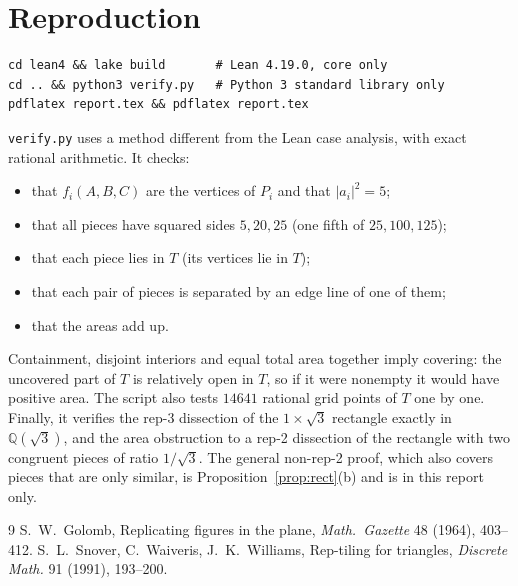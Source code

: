 \documentclass[11pt]{article}
\theoremstyle{definition}
\theoremstyle{remark}
\begin{document}
\section{Reproduction}
\begin{verbatim}
cd lean4 && lake build       # Lean 4.19.0, core only
cd .. && python3 verify.py   # Python 3 standard library only
pdflatex report.tex && pdflatex report.tex
\end{verbatim}
\texttt{verify.py} uses a method different from the Lean case analysis, with exact rational
arithmetic. It checks:
\begin{itemize}
\item that $f_i(A,B,C)$ are the vertices of $P_i$ and that $|a_i|^2=5$;
\item that all pieces have squared sides $5,20,25$ (one fifth of $25,100,125$);
\item that each piece lies in $T$ (its vertices lie in $T$);
\item that each pair of pieces is separated by an edge line of one of them;
\item that the areas add up.
\end{itemize}
Containment, disjoint interiors and equal total area together imply covering: the uncovered
part of $T$ is relatively open in $T$, so if it were nonempty it would have positive area.
The script also tests $14641$ rational grid points of $T$ one by one. Finally, it verifies
the rep-3 dissection of the $1\times\sqrt3$ rectangle exactly in $\mathbb Q(\sqrt3)$, and the
area obstruction to a rep-2 dissection of the rectangle with two congruent pieces of ratio
$1/\sqrt3$. The general non-rep-2 proof, which also covers pieces that are only similar, is
Proposition~\ref{prop:rect}(b) and is in this report only.

\begin{thebibliography}{9}
 S.~W.~Golomb, Replicating figures in the plane, \emph{Math.\ Gazette} 48
(1964), 403--412.
 S.~L.~Snover, C.~Waiveris, J.~K.~Williams, Rep-tiling for triangles,
\emph{Discrete Math.} 91 (1991), 193--200.
\end{thebibliography}
\end{document}
